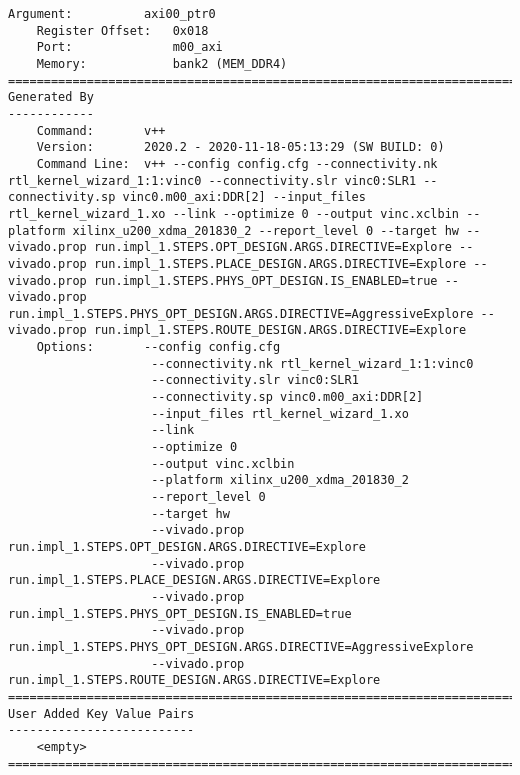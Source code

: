 \begin{center}
\begin{lstlisting}[label=lst:xclbin_info,caption=Файл vinc.xclbin.info]
    Argument:          axi00_ptr0
    Register Offset:   0x018
    Port:              m00_axi
    Memory:            bank2 (MEM_DDR4)
==============================================================================
Generated By
------------
    Command:       v++
    Version:       2020.2 - 2020-11-18-05:13:29 (SW BUILD: 0)
    Command Line:  v++ --config config.cfg --connectivity.nk rtl_kernel_wizard_1:1:vinc0 --connectivity.slr vinc0:SLR1 --connectivity.sp vinc0.m00_axi:DDR[2] --input_files rtl_kernel_wizard_1.xo --link --optimize 0 --output vinc.xclbin --platform xilinx_u200_xdma_201830_2 --report_level 0 --target hw --vivado.prop run.impl_1.STEPS.OPT_DESIGN.ARGS.DIRECTIVE=Explore --vivado.prop run.impl_1.STEPS.PLACE_DESIGN.ARGS.DIRECTIVE=Explore --vivado.prop run.impl_1.STEPS.PHYS_OPT_DESIGN.IS_ENABLED=true --vivado.prop run.impl_1.STEPS.PHYS_OPT_DESIGN.ARGS.DIRECTIVE=AggressiveExplore --vivado.prop run.impl_1.STEPS.ROUTE_DESIGN.ARGS.DIRECTIVE=Explore 
    Options:       --config config.cfg
                    --connectivity.nk rtl_kernel_wizard_1:1:vinc0
                    --connectivity.slr vinc0:SLR1
                    --connectivity.sp vinc0.m00_axi:DDR[2]
                    --input_files rtl_kernel_wizard_1.xo
                    --link
                    --optimize 0
                    --output vinc.xclbin
                    --platform xilinx_u200_xdma_201830_2
                    --report_level 0
                    --target hw
                    --vivado.prop run.impl_1.STEPS.OPT_DESIGN.ARGS.DIRECTIVE=Explore
                    --vivado.prop run.impl_1.STEPS.PLACE_DESIGN.ARGS.DIRECTIVE=Explore
                    --vivado.prop run.impl_1.STEPS.PHYS_OPT_DESIGN.IS_ENABLED=true
                    --vivado.prop run.impl_1.STEPS.PHYS_OPT_DESIGN.ARGS.DIRECTIVE=AggressiveExplore
                    --vivado.prop run.impl_1.STEPS.ROUTE_DESIGN.ARGS.DIRECTIVE=Explore 
==============================================================================
User Added Key Value Pairs
--------------------------
    <empty>
==============================================================================
\end{lstlisting}
\end{center}


\clearpage


